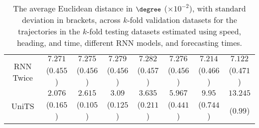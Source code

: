 \begin{table}[!ht]
{\begin{tabular}{|c|c|c|c|c|c|c|c|}
			\multirow{2}{*}{RNN Twice} & $7.271$ & $7.275$ & $7.279$ & $7.282$ & $7.276$ & $7.214$ & $7.122$ \\
			 & ($0.455$) & ($0.456$) & ($0.456$) & ($0.457$) & ($0.456$) & ($0.466$) & ($0.471$) \\ \hline
			\multirow{2}{*}{UniTS} & $2.076$ & $2.615$ & $3.09$ & $3.635$ & $5.967$ & $9.95$ & $13.245$ \\
			 & ($0.165$) & ($0.105$) & ($0.125$) & ($0.211$) & ($0.441$) & ($0.744$) & ($0.99$) \\ \hline
		\end{tabular}
	}
	\caption{The average Euclidean distance in $\degree$ ($\times 10^{-2}$), with standard deviation in brackets, across $k$-fold validation datasets for the trajectories in the $k$-fold testing datasets estimated using speed, heading, and time, different RNN models, and forecasting times.}
	\label{tab:all_speed_actual_dir_euclid}
\end{table}